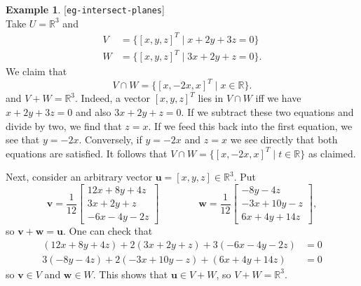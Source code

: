 \documentclass{amsart}
\newcommand{\lbl}[1]{\label{#1}\textup{[\texttt{#1}]}\ \\}
\newcommand{\lbl}{\label}
\newcommand{\R}         {{\mathbb{R}}}
\newcommand{\bbm}       {\left[\begin{matrix}}
\newcommand{\ebm}       {\end{matrix}\right]}
\newcommand{\st}        {\;|\;}
\newcommand{\vu}        {\mathbf{u}}
\newcommand{\vv}        {\mathbf{v}}
\newcommand{\vw}        {\mathbf{w}}
\renewcommand{\:}       {\colon}
\theoremstyle{definition}
\newtheorem{example}[theorem]{Example}
\begin{document}
\begin{example}\lbl{eg-intersect-planes}
 Take $U=\R^3$ and 
 \begin{align*}
  V &= \{[x,y,z]^T \st x+2y+3z = 0 \} \\
  W &= \{[x,y,z]^T \st 3x+2y+z = 0 \}.
 \end{align*}
 We claim that 
 \[ V\cap W= \{[x,-2x,x]^T \st x\in\R\}. \]
 and $V+W=\R^3$.  Indeed, a vector $[x,y,z]^T$ lies in
 $V\cap W$ iff we have $x+2y+3z=0$ and also $3x+2y+z=0$.  If
 we subtract these two equations and divide by two, we find
 that $z=x$.  If we feed this back into the first equation,
 we see that $y=-2x$.  Conversely, if $y=-2x$ and $z=x$ we
 see directly that both equations are satisfied.  It follows
 that $V\cap W= \{[x,-2x,x]^T \st t\in\R\}$ as claimed.  

 Next, consider an arbitrary vector $\vu=[x,y,z]\in\R^3$.
 Put 
 \[ \vv = \frac{1}{12} \bbm 12 x + 8 y + 4z  \\
                            3  x + 2 y +  z  \\
                            -6 x - 4 y - 2 z \ebm 
    \hspace{4em}
    \vw = \frac{1}{12} \bbm - 8 y - 4z  \\
                            - 3 x + 10 y -  z  \\
                              6 x + 4 y + 14 z \ebm,
 \]
 so $\vv+\vw=\vu$.  One can check that 
 \begin{align*}
  (12 x + 8 y + 4z) + 2(3  x + 2 y +  z) + 3(-6 x - 4 y - 2 z) &= 0 \\
  3(- 8 y - 4z) + 2(- 3 x + 10 y -  z) + (6 x + 4 y + 14 z) &= 0
 \end{align*}
 so $\vv\in V$ and $\vw\in W$.  This shows that
 $\vu\in V+W$, so $V+W=\R^3$.
\end{example}
\end{document}
